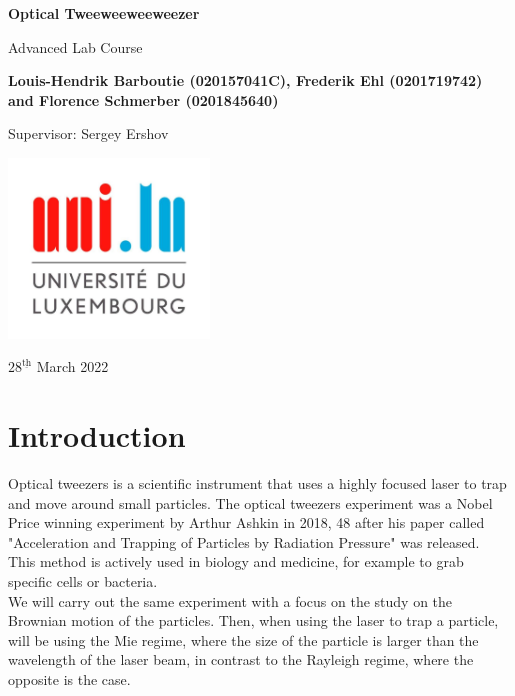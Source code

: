 \documentclass{article}
\begin{document}
\begin{titlepage}
    \begin{center}
        \vspace*{1cm}
        \Huge
        \textbf{Optical Tweeweeweeweezer}
    
        
        \vspace{0.5cm}
        \LARGE
        Advanced Lab Course
        
        \vspace{1.5cm}
        \textbf{Louis-Hendrik Barboutie (020157041C), Frederik Ehl (0201719742) and Florence Schmerber (0201845640)}
        
        \vspace{1cm}
        Supervisor: Sergey Ershov
        \vfill
        

        \includegraphics[width=0.4\textwidth]{logo_uni.jpg}
        
        \Large
        $28^{\underline{\text{th}}}$ March 2022
    \end{center}
\end{titlepage}


\section{Introduction}
Optical tweezers is a scientific instrument that uses a highly focused laser to trap and move around small particles. The optical tweezers experiment was a Nobel Price winning experiment by Arthur Ashkin in 2018, 48 after his paper called "Acceleration and Trapping of Particles by Radiation Pressure" was released.\\
This method is actively used in biology and medicine, for example to grab specific cells or bacteria.\\
We will carry out the same experiment with a focus on the study on the Brownian motion of the particles. Then, when using the laser to trap a particle, will be using the Mie regime, where the size of the particle is larger than the wavelength of the laser beam, in contrast to the Rayleigh regime, where the opposite is the case.
\end{document}
